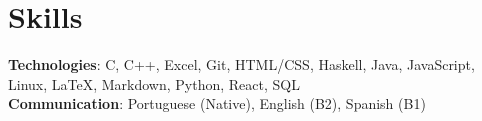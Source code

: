 \documentclass[letterpaper,11pt]{article}
\begin{document}
%
\section{Skills}
 \begin{itemize}[leftmargin=0.15in, label={}]
    \small{\item{
     \textbf{Technologies}{: C, C++, Excel, Git, HTML/CSS, Haskell, Java, JavaScript, Linux, \LaTeX, Markdown, Python, React, SQL} \\
     \textbf{Communication}{: Portuguese (Native), English (B2), Spanish (B1)}
    }}
 \end{itemize}
 \vspace{-16pt}
\end{document}
